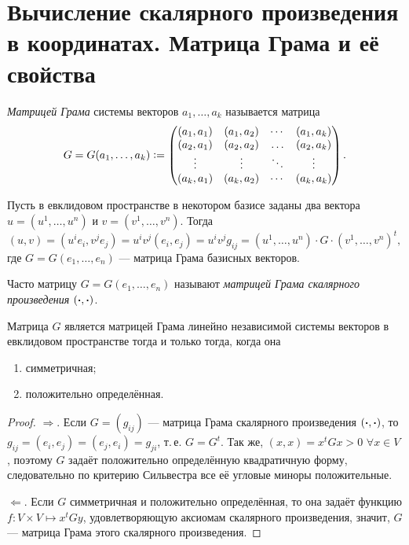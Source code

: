 \section{Вычисление скалярного произведения в координатах. Матрица Грама и её свойства}

\begin{definition}
    \textit{Матрицей Грама} системы векторов $a_1, \ldots, a_k$ называется матрица
    \[
        G = G(a_1, \ldots, a_k) \vcentcolon =
        \begin{pmatrix}
            (a_1, a_1) & (a_1, a_2) & \cdots & (a_1, a_k)\\
            (a_2, a_1) & (a_2, a_2) & \ldots & (a_2, a_k)\\
            \vdots & \vdots & \ddots & \vdots\\
            (a_k, a_1) & (a_k, a_2) & \cdots & (a_k, a_k)
        \end{pmatrix}.
    \]
\end{definition}

Пусть в евклидовом пространстве в некотором базисе заданы два вектора $u = (u^1, \ldots, u^n)$ и $v = (v^1, \ldots, v^n)$. Тогда
\[
    (u, v) = (u^ie_i, v^je_j) = u^iv^j(e_i, e_j) = u^iv^jg_{ij} = (u^1, \ldots, u^n) \cdot G \cdot (v^1, \ldots, v^n)^t,
\]
где $G = G(e_1, \ldots, e_n)$ --- матрица Грама базисных векторов.

\begin{definition}
    Часто матрицу $G = G(e_1, \ldots, e_n)$ называют \textit{матрицей Грама скалярного произведения} $(\boldsymbol{\cdot}, \boldsymbol{\cdot})$.
\end{definition}

\begin{theorem}
    Матрица $G$ является матрицей Грама линейно независимой системы векторов в евклидовом пространстве тогда и только тогда, когда она
    \begin{enumerate}[nolistsep]
        \item симметричная;
        \item положительно определённая.
    \end{enumerate}
\end{theorem}

\begin{proof}
    $\Rightarrow$. Если $G = (g_{ij})$ --- матрица Грама скалярного произведения $(\boldsymbol{\cdot}, \boldsymbol{\cdot})$, то $g_{ij} = (e_i, e_j) = (e_j, e_i) = g_{ji}$, т.\,е. $G = G^t$. Так же, $(x, x) = x^tGx > 0$ $\forall x \in V$, поэтому $G$ задаёт положительно определённую квадратичную форму, следовательно по критерию Сильвестра все её угловые миноры положительные.

    $\Leftarrow$. Если $G$ симметричная и положительно определённая, то она задаёт функцию $f: V \times V \mapsto x^tGy$, удовлетворяющую аксиомам скалярного произведения, значит, $G$ --- матрица Грама этого скалярного произведения.
\end{proof}

